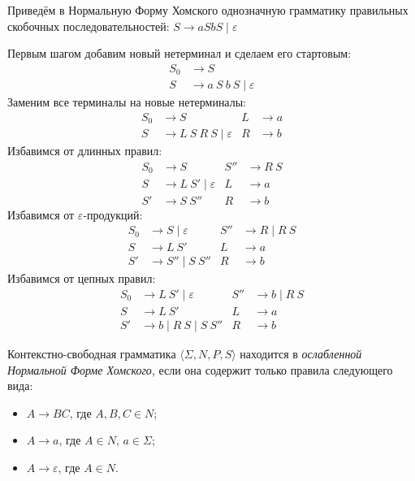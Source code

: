 \begin{example}
    Приведём в Нормальную Форму Хомского однозначную грамматику правильных скобочных последовательностей: $S \to a S b S \mid \varepsilon$

    Первым шагом добавим новый нетерминал и сделаем его стартовым:
    \begin{align*}
        S_0 & \to S                              \\
        S   & \to a \ S \ b \ S \mid \varepsilon
    \end{align*}
    Заменим все терминалы на новые нетерминалы:
    \begin{align*}
        S_0 & \to S                              & L & \to a \\
        S   & \to L \ S \ R \ S \mid \varepsilon & R & \to b
    \end{align*}
    Избавимся от длинных правил:
    \begin{align*}
        S_0 & \to S                       & S'' & \to R \ S \\
        S   & \to L \ S' \mid \varepsilon & L   & \to a     \\
        S'  & \to S \ S''                 & R   & \to b
    \end{align*}
    Избавимся от $\varepsilon$-продукций:
    \begin{align*}
        S_0 & \to S \mid \varepsilon & S'' & \to R   \mid R \ S \\
        S   & \to L \ S'             & L   & \to a              \\
        S'  & \to S'' \mid S \ S''   & R   & \to b
    \end{align*}
    Избавимся от цепных правил:
    \begin{align*}
        S_0 & \to L \ S' \mid \varepsilon   & S'' & \to b \mid R \ S \\
        S   & \to L \ S'                    & L   & \to a            \\
        S'  & \to b \mid R \ S \mid S \ S'' & R   & \to b
    \end{align*}
\end{example}

\begin{definition}
    \label{def:wCNF}
    Контекстно-свободная грамматика $\langle \Sigma, N, P, S\rangle$ находится в \emph{ослабленной Нормальной Форме Хомского}, если она содержит только правила следующего вида:
    \begin{itemize}
        \item $A \to B C$, где $A, B, C \in N$;
        \item $A \to a$, где $A \in N$, $a \in \Sigma$;
        \item $A \to \varepsilon$, где $A \in N$.
    \end{itemize}
\end{definition}

